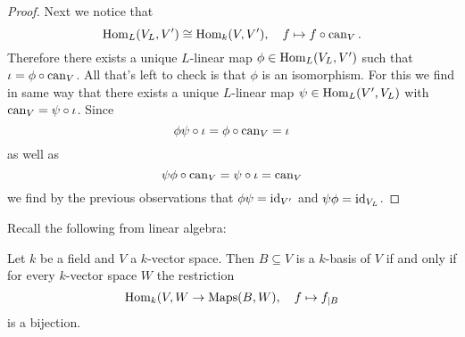\begin{proof}
  Next we notice that
  \[
            \operatorname{Hom}_L(V_L, V')
    \cong   \operatorname{Hom}_k(V, V'),
    \quad   f
    \mapsto f \circ \operatorname{can}_V.
  \]
  Therefore there exists a unique $L$-linear map $\phi \in \operatorname{Hom}_L(V_L, V')$ such that \mbox{$\iota = \phi \circ \operatorname{can}_V$}.
  All that’s left to check is that $\phi$ is an isomorphism.
  For this we find in same way that there exists a unique $L$-linear map $\psi \in \operatorname{Hom}_L(V', V_L)$ with $\operatorname{can}_V = \psi \circ \iota$.
  Since
  \[
      \phi \psi \circ \iota
    = \phi \circ \operatorname{can}_V
    = \iota
  \]
  as well as
  \[
      \psi \phi \circ \operatorname{can}_V
    = \psi \circ \iota
    = \operatorname{can}_V
  \]
  we find by the previous observations that $\phi \psi = \operatorname{id}_{V'}$ and $\psi \phi = \operatorname{id}_{V_L}$.
\end{proof}


Recall the following from linear algebra:


\begin{rec}
  Let $k$ be a field and $V$ a $k$-vector space.
  Then $B \subseteq V$ is a $k$-basis of $V$ if and only if for every $k$-vector space $W$ the restriction
  \[
        \operatorname{Hom}_k(V,W
    \to \operatorname{Maps}(B,W),
    \quad   f
    \mapsto f_{|B}
  \]
  is a bijection.
\end{rec}


